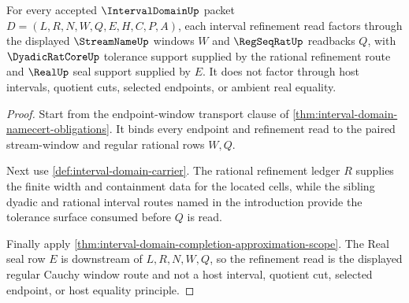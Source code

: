 \begin{theorem}
\label{thm:interval-domain-regular-cauchy-window}
For every accepted $\IntervalDomainUp$ packet $D=(L,R,N,W,Q,E,H,C,P,A)$, each interval refinement read factors through the displayed $\StreamNameUp$ windows $W$ and $\RegSeqRatUp$ readbacks $Q$, with $\DyadicRatCoreUp$ tolerance support supplied by the rational refinement route and $\RealUp$ seal support supplied by $E$. It does not factor through host intervals, quotient cuts, selected endpoints, or ambient real equality.
\end{theorem}
\begin{proof}
Start from the endpoint-window transport clause of \autoref{thm:interval-domain-namecert-obligations}. It binds every endpoint and refinement read to the paired stream-window and regular rational rows $W,Q$.

Next use \autoref{def:interval-domain-carrier}. The rational refinement ledger $R$ supplies the finite width and containment data for the located cells, while the sibling dyadic and rational interval routes named in the introduction provide the tolerance surface consumed before $Q$ is read.

Finally apply \autoref{thm:interval-domain-completion-approximation-scope}. The Real seal row $E$ is downstream of $L,R,N,W,Q$, so the refinement read is the displayed regular Cauchy window route and not a host interval, quotient cut, selected endpoint, or host equality principle.
\end{proof}

